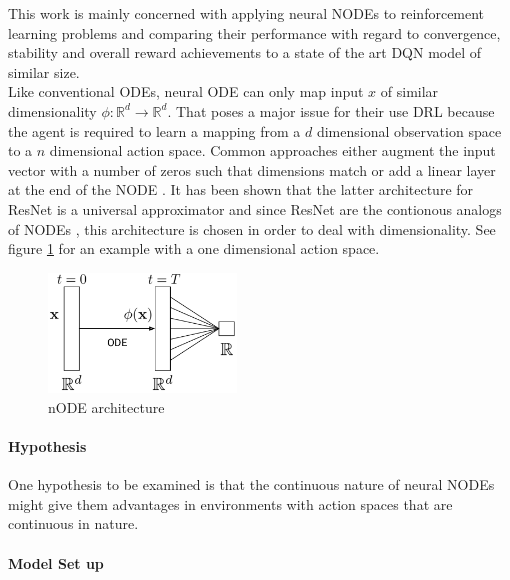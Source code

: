 \documentclass[10pt]{reportMaster}
\begin{document}
This work is mainly concerned with applying neural \ac{NODE}s to reinforcement learning problems and comparing their performance with regard to convergence, stability and overall reward achievements to a state of the art \ac{DQN} model of similar size. \\

Like conventional \ac{ODE}s, neural \ac{ODE} can only map input $x$ of similar dimensionality $\phi: \mathbb{R}^{d} \rightarrow \mathbb{R}^{d} $. That poses a major issue for their use \ac{DRL} because the agent is required to learn a mapping from a $d$ dimensional observation space to a $n$ dimensional action space. Common approaches either augment the input vector with a number of zeros such that dimensions match \cite{dupont2019augmented} or add a linear layer at the end of the \ac{NODE} \cite{lin2018resnet}. It has been shown that the latter architecture for ResNet \cite{jian2016deep} is a universal approximator \cite{lin2018resnet} and since ResNet are the contionous analogs of \ac{NODE}s \cite{sander2022residual}, this architecture is chosen in order to deal with dimensionality. See figure \ref{fig:nODEArchitecture} for an example with a one dimensional action space. 

\begin{figure}
\centering
\includegraphics[width=5cm]{nODEArchitecture}
\caption{nODE architecture  \cite[Figure 2]{dupont2019augmented}}
\label{fig:nODEArchitecture}
\end{figure}

\paragraph{Hypothesis} 
One hypothesis to be examined is that the continuous nature of neural \ac{NODE}s might give them advantages in environments with action spaces that are continuous in nature. 

\paragraph{Model Set up} 

\end{document}
